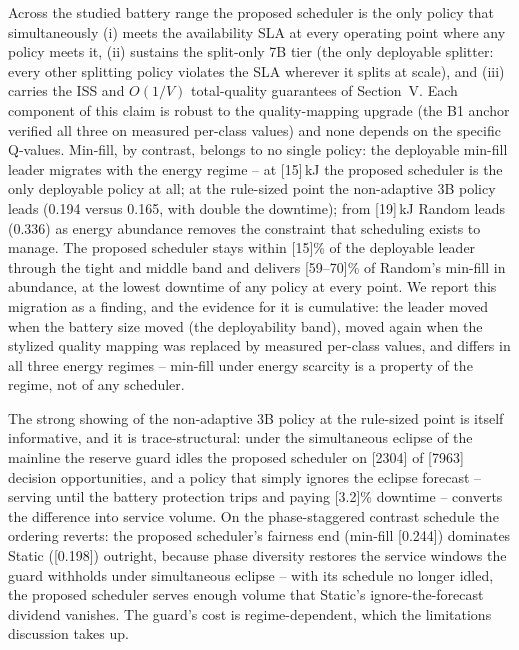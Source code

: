 
Across the studied battery range the proposed scheduler is the only policy
that simultaneously (i) meets the availability SLA at every operating point
where any policy meets it, (ii) sustains the split-only 7B tier (the only
deployable splitter: every other splitting policy violates the SLA wherever
it splits at scale), and (iii) carries the ISS and $O(1/V)$ total-quality
guarantees of Section~V. Each component of this claim is robust to the
quality-mapping upgrade (the B1 anchor verified all three on measured
per-class values) and none depends on the specific Q-values. Min-fill, by
contrast, belongs to no single policy: the deployable min-fill leader
migrates with the energy regime -- at [15]\,kJ the proposed scheduler is the
only deployable policy at all; at the rule-sized point the non-adaptive 3B
policy leads (0.194 versus 0.165, with double the downtime); from
[19]\,kJ Random leads (0.336) as energy abundance removes the constraint
that scheduling exists to manage. The proposed scheduler stays within
[15]\% of the deployable leader through the tight and middle band and
delivers [59--70]\% of Random's min-fill in abundance, at the lowest
downtime of any policy at every point. We report this migration as a
finding, and the evidence for it is cumulative: the leader moved when the
battery size moved (the deployability band), moved again when the stylized
quality mapping was replaced by measured per-class values, and differs in
all three energy regimes -- min-fill under energy scarcity is a property of
the regime, not of any scheduler.

The strong showing of the non-adaptive 3B policy at the rule-sized point is
itself informative, and it is trace-structural: under the simultaneous
eclipse of the mainline the reserve guard idles the proposed scheduler on
[2304] of [7963] decision opportunities, and a policy that simply ignores
the eclipse forecast -- serving until the battery protection trips and
paying [3.2]\% downtime -- converts the difference into service volume. On
the phase-staggered contrast schedule the ordering reverts: the proposed
scheduler's fairness end (min-fill [0.244]) dominates Static ([0.198])
outright, because phase diversity restores the service windows the guard
withholds under simultaneous eclipse -- with its schedule no longer idled,
the proposed scheduler serves enough volume that Static's
ignore-the-forecast dividend vanishes. The guard's cost is
regime-dependent, which the limitations discussion takes up.


